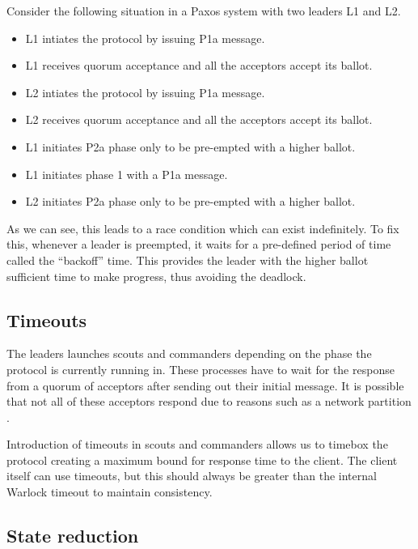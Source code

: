 Consider the following situation in a Paxos system with two leaders L1 and L2.

\begin{itemize}
  \item L1 intiates the protocol by issuing P1a message.
  \item L1 receives quorum acceptance and all the acceptors accept its ballot.
  \item L2 intiates the protocol by issuing P1a message.
  \item L2 receives quorum acceptance and all the acceptors accept its ballot.
  \item L1 initiates P2a phase only to be pre-empted with a higher ballot.
  \item L1 initiates phase 1 with a P1a message.
  \item L2 initiates P2a phase only to be pre-empted with a higher ballot.
\end{itemize}

As we can see, this leads to a race condition which can exist indefinitely. To
fix this, whenever a leader is preempted, it waits for a pre-defined period of
time called the ``backoff'' time. This provides the leader with the higher 
ballot sufficient time to make progress, thus avoiding the deadlock.

\subsection{Timeouts}

The leaders launches scouts and commanders depending on the phase the protocol
is currently running in. These processes have to wait for the response from
a quorum of acceptors after sending out their initial message. It is possible
that not all of these acceptors respond due to reasons such as a network
partition%
.

Introduction of timeouts in scouts and commanders allows us to timebox the
protocol creating a maximum bound for response time to the client. The client
itself can use timeouts, but this should always be greater than the internal
Warlock timeout to maintain consistency.

\subsection{State reduction}

